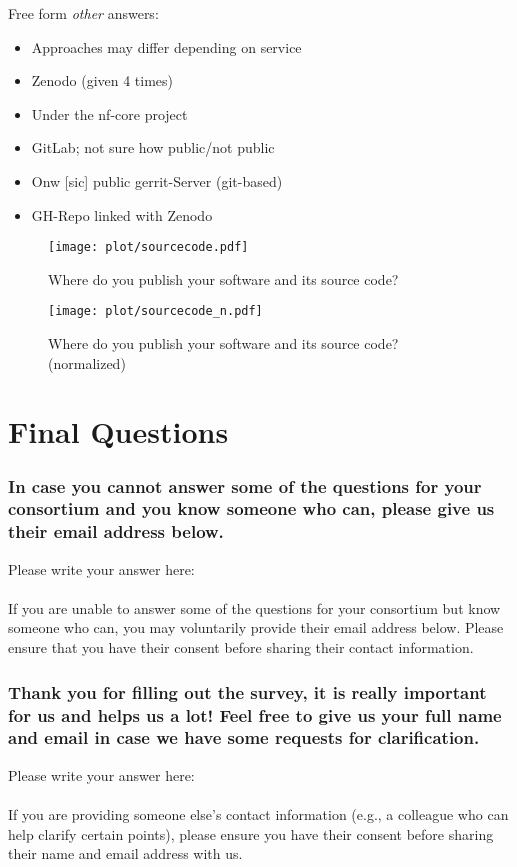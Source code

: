 \documentclass[headsepline,titlepage,twoside,12pt,toc=flat,headings=normal]{scrreprt}
\newcommand{\question}[1]{\subsubsection{#1}}
\newcommand{\otherbox}{\fbox{\phantom{This is how big an answer would be.}}}
\begin{document}
Free form \emph{other} answers:
\begin{itemize}
\item Approaches may differ depending on service
\item Zenodo (given 4 times)
\item Under the nf-core project
\item GitLab; not sure how public/not public
\item Onw [sic] public gerrit-Server (git-based)
\item GH-Repo linked with Zenodo
\end{itemize}

\clearpage
\begin{figure}[h!]
\caption{Where do you publish your software and its source code?}
\label{fig:sourcecode}
\texttt{[image: plot/sourcecode.pdf]}
\end{figure}

\begin{figure}[h!]
\caption{Where do you publish your software and its source code?\\(normalized)}
\label{fig:sourcecode_n}
\texttt{[image: plot/sourcecode\_n.pdf]}
\end{figure}

\clearpage
\section{Final Questions}\label{final-questions}

\question{In case you cannot answer some of the questions for your consortium and you know someone who can, please give us their email address below.}

Please write your answer here: \otherbox

\paragraph{}
If you are unable to answer some of the questions for your consortium but know someone who can, you may voluntarily provide their email address below.
Please ensure that you have their consent before sharing their contact information.

\question{Thank you for filling out the survey, it is really important for us and helps us a lot! Feel free to give us your full name and email in case we have some requests for clarification.}
Please write your answer here: \otherbox

\paragraph{}
If you are providing someone else's contact information (e.g., a colleague who can help clarify certain points), please ensure you have their consent before sharing their name and email address with us.
\end{document}

